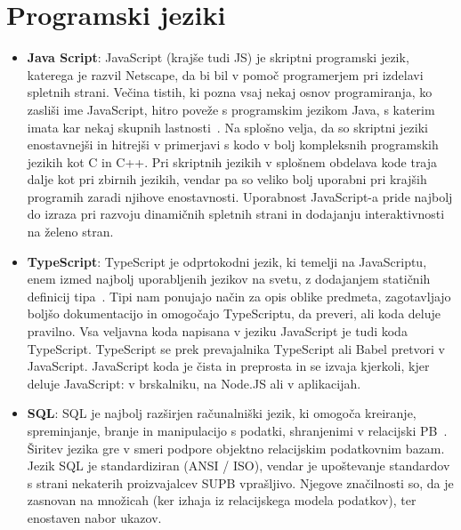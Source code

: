 \documentclass[a4paper, 12pt]{book}
\begin{document}
\section{Programski jeziki}
 \begin{itemize}
  \item \textbf{Java Script}: JavaScript (krajše tudi JS) je skriptni programski jezik, katerega je razvil Netscape, da bi bil v pomoč programerjem pri izdelavi spletnih strani. Večina tistih, ki pozna vsaj nekaj osnov programiranja, ko zasliši ime JavaScript, hitro poveže s programskim jezikom Java, s katerim imata kar nekaj skupnih lastnosti~\cite{JS}. Na splošno velja, da so skriptni jeziki enostavnejši in hitrejši v primerjavi s kodo v bolj kompleksnih programskih jezikih kot C in C++. Pri skriptnih jezikih v splošnem obdelava kode traja dalje kot pri zbirnih jezikih, vendar pa so veliko bolj uporabni pri krajših programih zaradi njihove enostavnosti. Uporabnost JavaScript-a pride najbolj do izraza pri razvoju dinamičnih spletnih strani in dodajanju interaktivnosti na želeno stran.
  
  \item \textbf{TypeScript}: TypeScript je odprtokodni jezik, ki temelji na JavaScriptu, enem izmed najbolj uporabljenih jezikov na svetu, z dodajanjem statičnih definicij tipa~\cite{TS}. Tipi nam ponujajo način za opis oblike predmeta, zagotavljajo boljšo dokumentacijo in omogočajo TypeScriptu, da preveri, ali koda deluje pravilno.
Vsa veljavna koda napisana v jeziku JavaScript je tudi koda TypeScript. TypeScript se prek prevajalnika TypeScript ali Babel pretvori v JavaScript. JavaScript koda je čista in preprosta in se izvaja kjerkoli, kjer deluje JavaScript: v brskalniku, na Node.JS ali v aplikacijah.
  
  \item \textbf{SQL}: SQL je najbolj razširjen računalniški jezik, ki omogoča kreiranje, spreminjanje, branje in manipulacijo s podatki, shranjenimi v relacijski PB~\cite{SQL}. Širitev jezika gre v smeri podpore objektno relacijskim podatkovnim bazam. Jezik SQL je standardiziran (ANSI / ISO), vendar je upoštevanje standardov s strani nekaterih proizvajalcev SUPB vprašljivo. Njegove značilnosti so, da je zasnovan na množicah (ker izhaja iz relacijskega modela podatkov), ter enostaven nabor ukazov.
\end{itemize}
\end{document}
